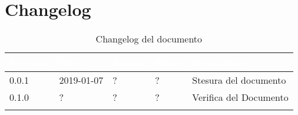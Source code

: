 \newpage

\section{Changelog}

\begin{center}
\begin{longtable}[c]{|m{}|m{}|m{}|m{}|p{}|}
\hline
\rowcolor{bluelogo}\textbf{\textcolor{white}{Versione}} & \textbf{\textcolor{white}{Data}} & \textbf{\textcolor{white}{Autore}} & \textbf{\textcolor{white}{Ruolo}} & \textbf{\textcolor{white}{Descrizione}}\\
\hline \hline
\endfirsthead
0.0.1 & 2019-01-07 & ? & ? & Stesura del documento \\
\hline
\rowcolor{grigio} 0.1.0 & ? & ? & ? & Verifica del Documento \\
\hline
\caption{Changelog del documento}
\end{longtable}
\end{center}
